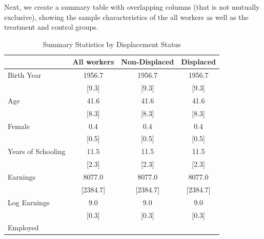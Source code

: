 \documentclass{article}
\begin{document}
\clearpage
Next, we create a summary table with overlapping columns (that is not mutually exclusive), showing
the sample characteristics of the all workers as well as the treatment and control groups.
\begin{table}[htbp] 
\centering 
\begin{threeparttable} 
\caption{Summary Statistics by Displacement Status} 

\centering
\begin{tabular}{llll}
\toprule
\multicolumn{1}{c}{} &
  \multicolumn{1}{r}{All workers} &
  \multicolumn{1}{r}{Non-Displaced} &
  \multicolumn{1}{r}{Displaced} \\
\midrule
\multicolumn{1}{l}{Birth Year} &
  \multicolumn{1}{c}{1956.7} &
  \multicolumn{1}{c}{1956.7} &
  \multicolumn{1}{c}{1956.7} \\
\multicolumn{1}{l}{} &
  \multicolumn{1}{c}{[9.3]} &
  \multicolumn{1}{c}{[9.3]} &
  \multicolumn{1}{c}{[9.3]} \\
\multicolumn{1}{l}{Age} &
  \multicolumn{1}{c}{41.6} &
  \multicolumn{1}{c}{41.6} &
  \multicolumn{1}{c}{41.6} \\
\multicolumn{1}{l}{} &
  \multicolumn{1}{c}{[8.3]} &
  \multicolumn{1}{c}{[8.3]} &
  \multicolumn{1}{c}{[8.3]} \\
\multicolumn{1}{l}{Female} &
  \multicolumn{1}{c}{0.4} &
  \multicolumn{1}{c}{0.4} &
  \multicolumn{1}{c}{0.4} \\
\multicolumn{1}{l}{} &
  \multicolumn{1}{c}{[0.5]} &
  \multicolumn{1}{c}{[0.5]} &
  \multicolumn{1}{c}{[0.5]} \\
\multicolumn{1}{l}{Years of Schooling} &
  \multicolumn{1}{c}{11.5} &
  \multicolumn{1}{c}{11.5} &
  \multicolumn{1}{c}{11.5} \\
\multicolumn{1}{l}{} &
  \multicolumn{1}{c}{[2.3]} &
  \multicolumn{1}{c}{[2.3]} &
  \multicolumn{1}{c}{[2.3]} \\
\multicolumn{1}{l}{Earnings} &
  \multicolumn{1}{c}{8077.0} &
  \multicolumn{1}{c}{8077.0} &
  \multicolumn{1}{c}{8077.0} \\
\multicolumn{1}{l}{} &
  \multicolumn{1}{c}{[2384.7]} &
  \multicolumn{1}{c}{[2384.7]} &
  \multicolumn{1}{c}{[2384.7]} \\
\multicolumn{1}{l}{Log Earnings} &
  \multicolumn{1}{c}{9.0} &
  \multicolumn{1}{c}{9.0} &
  \multicolumn{1}{c}{9.0} \\
\multicolumn{1}{l}{} &
  \multicolumn{1}{c}{[0.3]} &
  \multicolumn{1}{c}{[0.3]} &
  \multicolumn{1}{c}{[0.3]} \\
\multicolumn{1}{l}{Employed} &

\end{tabular}
\end{threeparttable}
\end{table}
\end{document}
